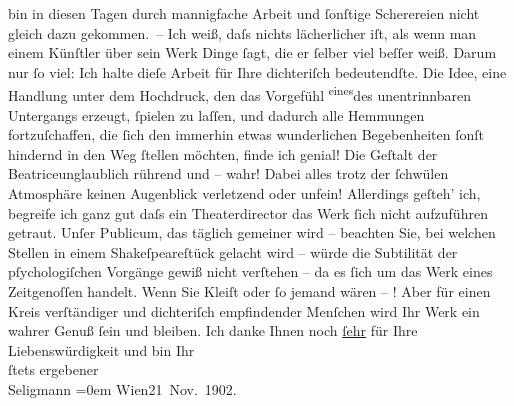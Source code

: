\begin{ledgroupsized}[t]{13cm}
               bin in diesen Tagen durch mannigfache Arbeit und ſonſtige Scherereien nicht gleich
               dazu gekommen. – Ich weiß, daſs nichts lächerlicher iſt, als wenn man einem Künſtler
               über sein {\pb}Werk Dinge ſagt, die er ſelber viel beſſer weiß. Darum nur ſo viel: Ich halte
               dieſe Arbeit für Ihre dichteriſch bedeutendſte. Die Idee, eine Handlung unter dem
               Hochdruck, den das Vorgefühl \substVorne{}\textsuperscript{eines}\substDazwischen{}des\substHinten{} unentrinnbaren Untergangs erzeugt, ſpielen zu laſſen, und dadurch alle
               Hemmungen fortzuſchaffen, die ſich den immerhin etwas wunderlichen Begebenheiten
               ſonſt hindernd in den Weg ſtellen möchten, finde ich genial! Die Geſtalt der Beatriceunglaublich rührend und – wahr! Dabei
               alles trotz der ſchwülen Atmosphäre keinen Augenblick verletzend oder unfein!
               Allerdings geſteh’ ich, begreife ich ganz gut daſs ein Theaterdirector das Werk ſich
               nicht aufzuführen getraut. Unſer Publicum, das täglich gemeiner wird – beachten Sie,
               bei welchen Stellen in einem Shakeſpeareſtück
               gelacht wird – würde die Subtilität der pſychologiſchen Vorgänge gewiß nicht
               verſtehen – da es ſich um das Werk eines Zeitgenoſſen handelt. Wenn Sie {\pb}Kleiſt oder ſo jemand wären – \textsc{\label{K_L01250_2v}\label{K_L01250_2h}}! Aber für einen Kreis verſtändiger und dichteriſch empfindender Menſchen wird
               Ihr Werk ein wahrer Genuß ſein und bleiben. Ich danke Ihnen noch \uline{ſehr} für Ihre Liebenswürdigkeit und\pend
           \pstart
           bin Ihr{\\[\baselineskip]}ſtets ergebener{\\[\baselineskip]}\spacefill\mbox{Seligmann}\pend
           \leftskip=0em{}\pstart
           Wien21 Nov. 1902.\pend
                     \endnumbering{}\end{ledgroupsized}  \newcommand{\dateiname}{L01250}\newcommand{\titel}{Adalbert Seligmann an Arthur Schnitzler, 21. 11. 1902}\newcommand{\editorInnen}{Martin Anton Müller und Gerd-Hermann Susen}
            \footnotesize
\begin{ledgroupsized}[t]{11.5cm}
\end{ledgroupsized}
         
      